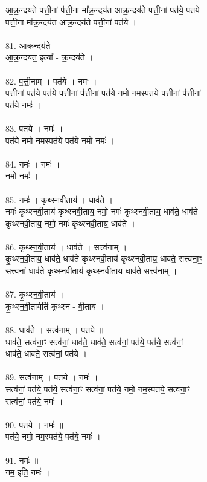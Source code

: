 आ॒क्र॒न्दय॑ते पत्ती॒नां प॑त्ती॒ना मा᳚क्र॒न्दय॑त आक्र॒न्दय॑ते पत्ती॒नां पत॑ये॒ पत॑ये\\
पत्ती॒ना मा᳚क्र॒न्दय॑त आक्र॒न्दय॑ते पत्ती॒नां पत॑ये ।\\
\\
81. आ॒क्र॒न्दय॑ते ।\\
आ॒क्र॒न्दय॑त॒ इत्या᳚ - क्र॒न्दय॑ते ।\\
\\
82. प॒त्ती॒नाम् । पत॑ये । नमः॑ ।\\
प॒त्ती॒नां पत॑ये॒ पत॑ये पत्ती॒नां प॑त्ती॒नां पत॑ये॒ नमो॒ नम॒स्पत॑ये पत्ती॒नां प॑त्ती॒नां\\
पत॑ये॒ नमः॑ ।\\
\\
83. पत॑ये । नमः॑ ।\\
पत॑ये॒ नमो॒ नम॒स्पत॑ये॒ पत॑ये॒ नमो॒ नमः॑ ।\\
\\
84. नमः॑ । नमः॑ ।\\
नमो॒ नमः॑ ।\\
\\
85. नमः॑ । कृ॒थ्स्न॒वी॒ताय॑ । धाव॑ते ।\\
नमः॑ कृथ्स्नवी॒ताय॑ कृथ्स्नवी॒ताय॒ नमो॒ नमः॑ कृथ्स्नवी॒ताय॒ धाव॑ते॒ धाव॑ते\\
कृथ्स्नवी॒ताय॒ नमो॒ नमः॑ कृथ्स्नवी॒ताय॒ धाव॑ते ।\\
\\
86. कृ॒थ्स्न॒वी॒ताय॑ । धाव॑ते । सत्त्व॑नाम् ।\\
कृ॒थ्स्न॒वी॒ताय॒ धाव॑ते॒ धाव॑ते कृथ्स्नवी॒ताय॑ कृथ्स्नवी॒ताय॒ धाव॑ते॒ सत्त्व॑ना॒ꣳ॒\\
सत्त्व॑नां॒ धाव॑ते कृथ्स्नवी॒ताय॑ कृथ्स्नवी॒ताय॒ धाव॑ते॒ सत्त्व॑नाम् ।\\
\\
87. कृ॒थ्स्न॒वी॒ताय॑ ।\\
कृ॒थ्स्न॒वी॒तायेति॑ कृथ्स्न - वी॒ताय॑ ।\\
\\
88. धाव॑ते । सत्व॑नाम् । पत॑ये ॥\\
धाव॑ते॒ सत्व॑ना॒ꣳ॒ सत्व॑नां॒ धाव॑ते॒ धाव॑ते॒ सत्व॑नां॒ पत॑ये॒ पत॑ये॒ सत्व॑नां॒\\
धाव॑ते॒ धाव॑ते॒ सत्व॑नां॒ पत॑ये ।\\
\\
89. सत्व॑नाम् । पत॑ये । नमः॑ ।\\
सत्व॑नां॒ पत॑ये॒ पत॑ये॒ सत्व॑ना॒ꣳ॒ सत्व॑नां॒ पत॑ये॒ नमो॒ नम॒स्पत॑ये॒ सत्व॑ना॒ꣳ॒\\
सत्व॑नां॒ पत॑ये॒ नमः॑ ।\\
\\
90. पत॑ये । नमः॑ ॥\\
पत॑ये॒ नमो॒ नम॒स्पत॑ये॒ पत॑ये॒ नमः॑ ।\\
\\
91. नमः॑ ॥\\
नम॒ इति॒ नमः॑ ।\\
